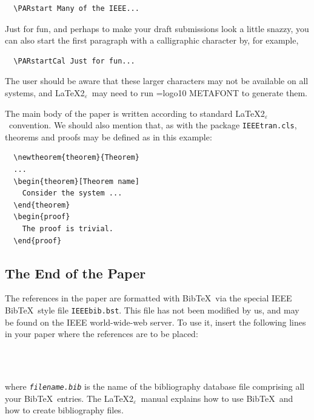 \documentclass[%
	final,
	notitlepage,
	narroweqnarray,
	inline,
	twoside,
	]{ieee}
\newcommand{\latexiie}{\LaTeX2{\Large$_\varepsilon$}}
\begin{document}
\unskip
\begin{verbatim}
  \PARstart Many of the IEEE...
\end{verbatim}

\PARstartCal Just for fun, and perhaps to make your draft submissions
look a little snazzy, you can also start the first paragraph with a
calligraphic character by, for example,

\unskip
\begin{verbatim}
  \PARstartCal Just for fun...
\end{verbatim}

The user should be aware that these larger characters may not be
available on all systems, and \latexiie\ may need to run
{\font\mf=logo10 \mf METAFONT} to generate them.

The main body of the paper is written according to standard \latexiie\
convention. We should also mention that, as with the package
\texttt{IEEEtran.cls}, theorems and proofs may be defined as in this
example: 
\begin{verbatim}
  \newtheorem{theorem}{Theorem}
  ...
  \begin{theorem}[Theorem name]
    Consider the system ...
  \end{theorem}
  \begin{proof}
    The proof is trivial.
  \end{proof}
\end{verbatim}

\subsection{The End of the Paper}

The references in the paper are formatted with {\sc Bib}\TeX\ via the
special IEEE {\sc Bib}\TeX\ style file \texttt{IEEEbib.bst}. This file
has not been modified by us, and may be found on the IEEE
world-wide-web server.  To use it, insert the following lines in your
paper where the references are to be placed:
\begin{verbatim}
  
  
\end{verbatim}
where \texttt{\emph{filename.bib\/}} is the name of the
bibliography data\-base file comprising all your {\sc Bib}\TeX\ entries.
The \latexiie\ manual explains how to use {\sc Bib}\TeX\ and how to
create bibliography files.
\end{document}

